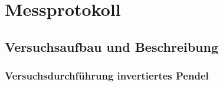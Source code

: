 

\def\skalierung{0.65}

\chapter{Messprotokoll}
\label{chap:protokoll}



\section{Versuchsaufbau und Beschreibung}
\label{sec:aufbau}



\subsection{Versuchsdurchführung invertiertes Pendel}

